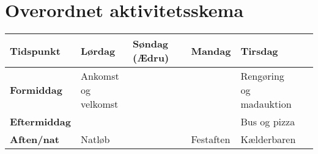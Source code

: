 \documentclass[../../main.tex]{subfiles}
\begin{document}
\section{Overordnet aktivitetsskema}

\begin{center}
\begin{tabular}{|p{2.2cm}|p{2.5cm}|p{2.5cm}|p{2.5cm}|p{2.5cm}|p{2.5cm}|}
\hline
\textbf{Tidspunkt}  & \textbf{Lørdag}       & \textbf{Søndag (Ædru)}    & \textbf{Mandag}   & \textbf{Tirsdag}  \\ \hline
\textbf{Formiddag}  & \makecell{Ankomst \\og velkomst}  &  &            & \makecell{Rengøring \\og madauktion}  \\ \hline 
\textbf{Eftermiddag}&                                   &  &            & Bus og pizza                          \\ \hline 
\textbf{Aften/nat}  & Natløb                            &  & Festaften  & Kælderbaren                           \\ \hline
\end{tabular}
\end{center}
\end{document}
